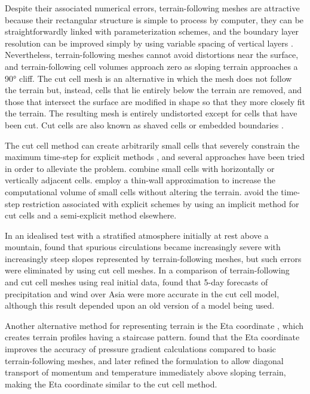 Despite their associated numerical errors, terrain-following meshes are attractive because their rectangular structure is simple to process by computer, they can be straightforwardly linked with parameterization schemes, and the boundary layer resolution can be improved simply by using variable spacing of vertical layers \citep{schaer2002}.
Nevertheless, terrain-following meshes cannot avoid distortions near the surface, and terrain-following cell volumes approach zero as sloping terrain approaches a \ang{90} cliff.
The cut cell mesh is an alternative in which the mesh does not follow the terrain but, instead, cells that lie entirely below the terrain are removed, and those that intersect the surface are modified in shape so that they more closely fit the terrain.
The resulting mesh is entirely undistorted except for cells that have been cut.
Cut cells are also known as shaved cells \citep{adcroft1997,adcroft2013} or embedded boundaries \citep{schwartz2015, devendran2017}.

The cut cell method can create arbitrarily small cells that severely constrain the maximum time-step for explicit methods \citep{klein2009}, and several approaches have been tried in order to alleviate the problem.
\citet{yamazaki-satomura2010} combine small cells with horizontally or vertically adjacent cells.
\citet{steppeler2002} employ a thin-wall approximation to increase the computational volume of small cells without altering the terrain.
\citet{jebens2011} avoid the time-step restriction associated with explicit schemes by using an implicit method for cut cells and a semi-explicit method elsewhere.

In an idealised test with a stratified atmosphere initially at rest above a mountain, \citet{good2014} found that spurious circulations became increasingly severe with increasingly steep slopes represented by terrain-following meshes, but such errors were eliminated by using cut cell meshes.
In a comparison of terrain-following and cut cell meshes using real initial data, \citet{steppeler2013} found that 5-day forecasts of precipitation and wind over Asia were more accurate in the cut cell model, although this result depended upon an old version of a model being used.

Another alternative method for representing terrain is the Eta coordinate \citep{mesinger1988}, which creates terrain profiles having a staircase pattern.
\citet{mesinger1988} found that the Eta coordinate improves the accuracy of pressure gradient calculations compared to basic terrain-following meshes, and \citet{mesinger2012} later refined the formulation to allow diagonal transport of momentum and temperature immediately above sloping terrain, making the Eta coordinate similar to the cut cell method.

